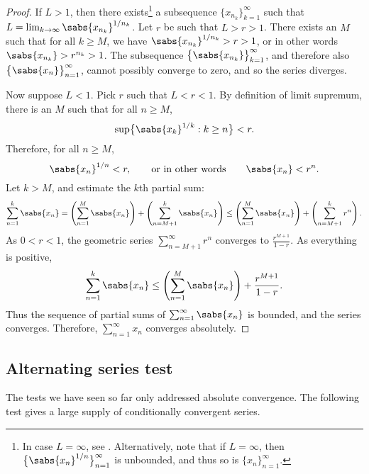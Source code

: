 \begin{proof}
If $L > 1$, then there exists\footnote{%
In case $L=\infty$, see .
Alternatively, note that if $L=\infty$, then $\bigl\{ {\sabs{x_{n}}}^{1/n}
\bigr\}_{n=1}^\infty$
is unbounded, and thus so is
$\{ x_n \}_{n=1}^\infty$.}
a subsequence $\{ x_{n_k} \}_{k=1}^\infty$ such that
$L = \lim_{k\to\infty} {\sabs{x_{n_k}}}^{1/n_k}$.  Let
$r$ be such that $L > r > 1$.  There exists an $M$ such
that for all $k \geq M$, we have 
${\sabs{x_{n_k}}}^{1/n_k} > r > 1$, or in other words
$\sabs{x_{n_k}} > r^{n_k} > 1$.
The subsequence 
$\bigl\{ \sabs{x_{n_k}} \bigr\}_{k=1}^\infty$,
and therefore also
$\bigl\{ \sabs{x_{n}} \bigr\}_{n=1}^\infty$,
cannot possibly converge to zero, and so the series diverges.

Now suppose $L < 1$.  Pick $r$ such that $L < r < 1$.
By definition of limit supremum,
there is an $M$ such that for all $n \geq M$,
\begin{equation*}
\sup \bigl\{ {\sabs{x_k}}^{1/k} : k \geq n \bigr\} < r .
\end{equation*}
Therefore, for all $n \geq M$,
\begin{equation*}
{\sabs{x_n}}^{1/n} < r , \qquad \text{or in other words} \qquad \sabs{x_n} < r^n .
\end{equation*}
Let $k > M$, and estimate the $k$th partial sum:
\begin{equation*}
\sum_{n=1}^k \sabs{x_n} = 
\left( \sum_{n=1}^M \sabs{x_n} \right) + 
\left( \sum_{n=M+1}^k \sabs{x_n} \right)
\leq
\left( \sum_{n=1}^M \sabs{x_n} \right) + 
\left( \sum_{n=M+1}^k r^n \right) .
\end{equation*}
As $0 < r < 1$,
the geometric series $\sum_{n=M+1}^\infty r^n$ converges to
$\frac{r^{M+1}}{1-r}$.  As everything is positive,
\begin{equation*}
\sum_{n=1}^k \sabs{x_n} 
\leq
\left( \sum_{n=1}^M \sabs{x_n} \right) + 
\frac{r^{M+1}}{1-r} .
\end{equation*}
Thus the sequence of partial sums of $\sum_{n=1}^\infty \sabs{x_n}$ is bounded, and
the series converges.  Therefore, $\sum_{n=1}^\infty x_n$ converges absolutely.
\end{proof}

\subsection{Alternating series test}

The tests we have seen so far only addressed absolute convergence.  The
following test gives a large supply of conditionally convergent series.


